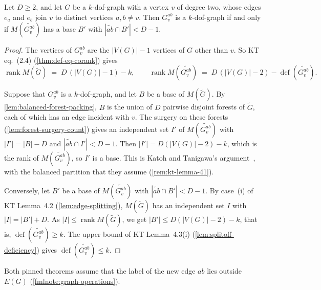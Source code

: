 \begin{lemma}
  \label{lem:splitoff-kdof-criterion}
  \leanok
  Let $D \ge 2$, and let $G$ be a $k$-dof-graph with a vertex $v$ of
  degree two, whose edges $e_a$ and $e_b$ join $v$ to distinct vertices
  $a, b \neq v$. Then $G_v^{ab}$ is a $k$-dof-graph if and only if
  $M(\widetilde{G_v^{ab}})$ has a base $B'$ with
  $|\widetilde{ab} \cap B'| < D - 1$.
\end{lemma}
\begin{proof}
  \leanok
  The vertices of $G_v^{ab}$ are the $|V(G)| - 1$ vertices of $G$ other
  than $v$. So KT eq.~(2.4) (\cref{thm:def-eq-corank}) gives
  \[
    \operatorname{rank} M(\tilde G) \;=\; D\,(|V(G)| - 1) - k,
    \qquad
    \operatorname{rank} M(\widetilde{G_v^{ab}}) \;=\;
    D\,(|V(G)| - 2) - \operatorname{def}(\widetilde{G_v^{ab}}).
  \]

  Suppose that $G_v^{ab}$ is a $k$-dof-graph, and let $B$ be a base of
  $M(\tilde G)$. By \cref{lem:balanced-forest-packing}, $B$ is the union
  of $D$ pairwise disjoint forests of $\tilde G$, each of which has an
  edge incident with $v$. The surgery on these forests
  (\cref{lem:forest-surgery-count}) gives an independent set $I'$ of
  $M(\widetilde{G_v^{ab}})$ with $|I'| = |B| - D$ and
  $|\widetilde{ab} \cap I'| < D - 1$. Then
  $|I'| = D(|V(G)| - 2) - k$, which is the rank of
  $M(\widetilde{G_v^{ab}})$, so $I'$ is a base. This is Katoh and
  Tanigawa's argument~\cite[p.~661]{katohTanigawa2011}, with the balanced
  partition that they assume (\cref{rem:kt-lemma-41}).

  Conversely, let $B'$ be a base of $M(\widetilde{G_v^{ab}})$ with
  $|\widetilde{ab} \cap B'| < D - 1$. By case~(i) of KT Lemma~4.2
  (\cref{lem:edge-splitting}), $M(\tilde G)$ has an independent set $I$
  with $|I| = |B'| + D$. As $|I| \le \operatorname{rank} M(\tilde G)$, we
  get $|B'| \le D(|V(G)| - 2) - k$, that is,
  $\operatorname{def}(\widetilde{G_v^{ab}}) \ge k$. The upper bound of KT
  Lemma~4.3(i) (\cref{lem:splitoff-deficiency}) gives
  $\operatorname{def}(\widetilde{G_v^{ab}}) \le k$.
\end{proof}

\begin{fmlnote}
  Both pinned theorems assume that the label of the new edge $ab$ lies
  outside $E(G)$ (\cref{fmlnote:graph-operations}).
\end{fmlnote}

